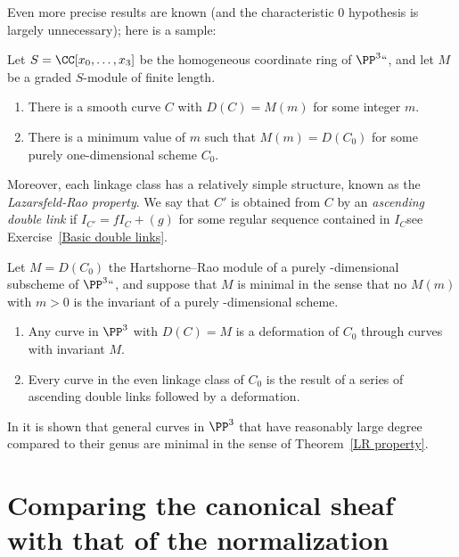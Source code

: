 \begin{fact}
Even more precise results are known (and the characteristic 0
hypothesis is largely unnecessary); here is a 
sample:
\begin{theorem}
Let $S = \CC[x_0, \dots, x_3]$ be the homogeneous coordinate ring of
$\PP^3` `$, and let $M$ be a graded $S$-module of finite length.
\begin{enumerate}
\item There is a smooth curve $C$ with $D(C) = M(m)$ for some integer $m$.
\item There is a minimum value of $m$ such that $M(m) = D(C_0)$ for some
purely one-dimensional scheme $C_0$.
\unif
\end{enumerate}
\end{theorem}

Moreover, each
linkage
class has a relatively simple structure, known
as the \emph{Lazarsfeld-Rao property}.
%
We say that $C'$ is obtained from $C$ by an \emph{ascending double link}
%
if $I_{C'} = fI_C+(g)$ for some regular sequence
contained in $I_C$\emdash see Exercise~\ref{Basic double links}.

\begin{npt}
\begin{theorem}[\cite{MR1087803}]
\label{LR property}
Let $M = D(C_0)$
the Hartshorne--Rao
module of a purely
\1-dimensional subscheme of $\PP^3` `$, and suppose that
%
$M$ is minimal in the sense that no $M(m)$ with $m>0$ is the invariant
of a purely \1-dimensional scheme.
\begin{enumerate}
\item Any curve in $\PP^3$ with $D(C) = M$ is a deformation of $C_{0}$
through curves with invariant $M$.
\item Every curve in the even linkage class of $C_0$ is the result of
a series of ascending double links followed by a deformation.
\end{enumerate}
\end{theorem}
\end{npt}

In \cite{MR714753} it is shown that general curves in $\PP^3$ that have
reasonably large degree compared to their genus are minimal in the sense
of Theorem~\ref{LR property}.
\end{fact}

\section{Comparing the canonical sheaf with that of the normalization}

